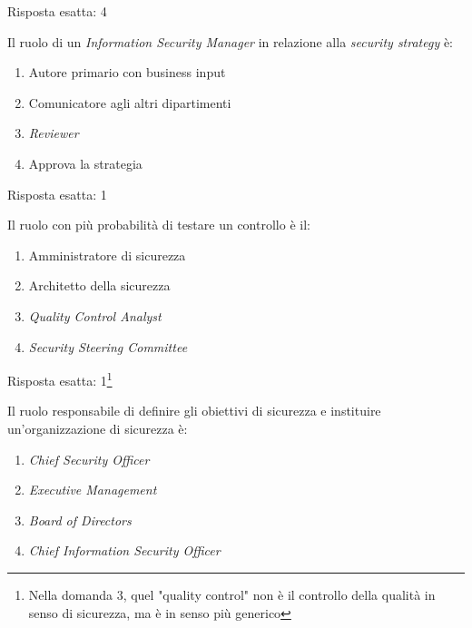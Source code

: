 \begin{Answer} [
  ref={esSA2},
  number={2}
  ]

  \Question Risposta esatta: 4
\end{Answer}


\begin{Exercise} [
  title={Quiz},
  label={esSA3}
  ]

  \Question Il ruolo di un \textit{Information Security Manager} in relazione 
alla \textit{security strategy} è:
\begin{enumerate}
 \item Autore primario con business input
 \item Comunicatore agli altri dipartimenti
 \item \textit{Reviewer}
 \item Approva la strategia
\end{enumerate}
  
\end{Exercise}

\begin{Answer} [
  ref={esSA3},
  number={3}
  ]

  \Question Risposta esatta: 1
\end{Answer}



\begin{Exercise} [
  title={Quiz},
  label={esSA4}
  ]

  \Question Il ruolo con più probabilità di testare un controllo è il:
  \begin{enumerate}
   \item Amministratore di sicurezza
   \item Architetto della sicurezza
   \item \textit{Quality Control Analyst}
   \item \textit{Security Steering Committee}
  \end{enumerate}

\end{Exercise}

\begin{Answer} [
  ref={esSA4},
  number={4}
  ]

  \Question Risposta esatta: 1\footnote{Nella domanda 3, quel "quality control" 
non è il controllo della qualità in senso di sicurezza, ma è in senso più 
generico}
\end{Answer}


\begin{Exercise} [
  title={Quiz},
  label={esSA5}
  ]

  \Question Il ruolo responsabile di definire gli obiettivi di sicurezza e 
instituire un'organizzazione di sicurezza è:
\begin{enumerate}
 \item \textit{Chief Security Officer}
 \item \textit{Executive Management}
 \item \textit{Board of Directors}
 \item \textit{Chief Information Security Officer}
\end{enumerate}

\end{Exercise}

